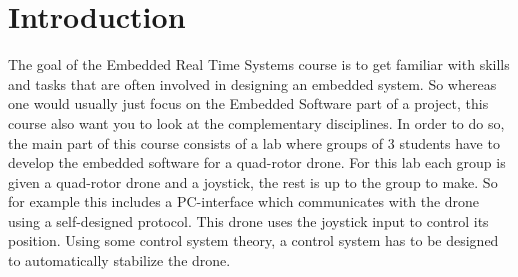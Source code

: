\documentclass[final]{article}
\begin{document}
\section{Introduction}

The goal of the Embedded Real Time Systems course is to get familiar with skills and tasks that are often involved in designing an embedded system.
So whereas one would usually just focus on the Embedded Software part of a project, this course also want you to look at the complementary disciplines.
In order to do so, the main part of this course consists of a lab where groups of 3 students have to develop the embedded software for a quad-rotor drone.
For this lab each group is given a quad-rotor drone and a joystick, the rest is up to the group to make.
So for example this includes a PC-interface which communicates with the drone using a self-designed protocol. This drone uses the joystick input to control its position.
Using some control system theory, a control system has to be designed to automatically stabilize the drone.
\end{document}
